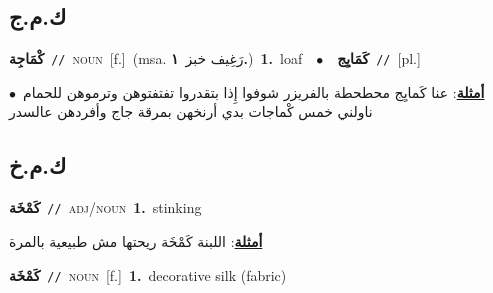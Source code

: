 \documentclass[10pt,a4paper,twoside]{article} %
\begin{document}
\begin{multicols}{2}
\vspace{-3mm}
\subsection*{\color{blue}\foreignlanguage{arabic}{ك.م.ج}\color{blue}{}} 

{\setlength\topsep{0pt}\textbf{\foreignlanguage{arabic}{كْمَاجِة}}\ {\color{gray}\texttt{//}\color{black}}\ \textsc{noun}\ [f.]\ \color{gray}(msa. \foreignlanguage{arabic}{رَغِيف خبز}~\foreignlanguage{arabic}{\textbf{١.}})\color{black}\ \textbf{1.}~loaf\ \ $\bullet$\ \ \setlength\topsep{0pt}\textbf{\foreignlanguage{arabic}{كَمَايِج}}\ {\color{gray}\texttt{//}\color{black}}\ [pl.]\  \begin{flushright}\color{gray}\foreignlanguage{arabic}{\textbf{\underline{\foreignlanguage{arabic}{أمثلة}}}: عنا كَمايِج محطحطة بالفريزر شوفوا إِذا بتقدروا تفتفتوهن وترموهن للحمام\ $\bullet$\ \  ناولني خمس كْماجات بدي أرنخهن بمرقة جاج وأفردهن عالسدر}\end{flushright}\color{black}} \vspace{2mm}

\vspace{-3mm}
\subsection*{\color{blue}\foreignlanguage{arabic}{ك.م.خ}\color{blue}{}} 

{\setlength\topsep{0pt}\textbf{\foreignlanguage{arabic}{كَمْخَة}}\ {\color{gray}\texttt{//}\color{black}}\ \textsc{adj/noun}\ \textbf{1.}~stinking\  \begin{flushright}\color{gray}\foreignlanguage{arabic}{\textbf{\underline{\foreignlanguage{arabic}{أمثلة}}}: اللبنة كَمْخَة ريحتها مش طبيعية بالمرة}\end{flushright}\color{black}} \vspace{2mm}

{\setlength\topsep{0pt}\textbf{\foreignlanguage{arabic}{كَمْخَة}}\ {\color{gray}\texttt{//}\color{black}}\ \textsc{noun}\ [f.]\ \textbf{1.}~decorative silk (fabric)\ } \vspace{2mm}


\end{multicols}
\end{document}

